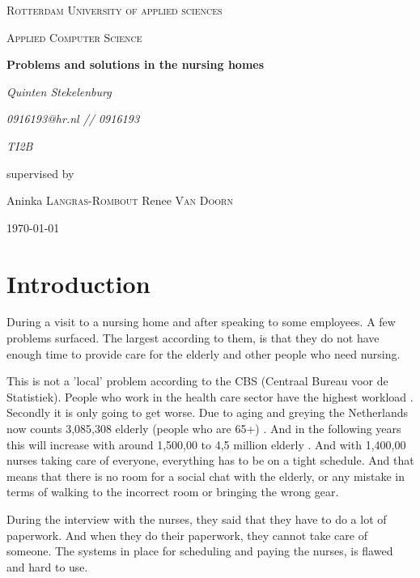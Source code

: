 \documentclass{report}
\begin{document}
\begin{titlepage}
	\centering
	{\scshape\LARGE Rotterdam University of applied sciences \par}
	{\scshape\LARGE Applied Computer Science \par}
	\vspace{1cm}
	{\huge\bfseries Problems and solutions in the nursing homes\par}
	\vspace{2cm}
	{\Large\itshape Quinten Stekelenburg \par}
	{\Large\itshape 0916193@hr.nl // 0916193 \par}
	{\Large\itshape TI2B \par}
	\vfill
	supervised by\par
	Aninka \textsc{Langras-Rombout}
	Renee \textsc{Van Doorn}

	\vfill

	{\large \today\par}
\end{titlepage}
\tableofcontents{}

\chapter{Introduction}
\thispagestyle{fancy}

During a visit to a nursing home and after speaking to some employees. A few problems surfaced. The largest according to them, is
that they do not have enough time to provide care for the elderly and other people who need nursing.

This is not a 'local' problem according to the CBS (Centraal Bureau voor
de Statistiek). People who work in the health care sector have the
highest workload \cite{CBS2016} . Secondly it is only going to get worse. Due to aging and greying
the Netherlands now counts 3,085,308 elderly (people who are 65+) \cite{CBSBevolking}. And
in the following years this will increase with around 1,500,00 to 4,5
million elderly \cite{CBSPrognose2014} . And with 1,400,00 nurses taking care of everyone,
everything has to be on a tight schedule. And that means that there is
no room for a social chat with the elderly, or any mistake in terms of walking to the incorrect room or bringing the wrong gear.

During the interview with the nurses, they said that they have to do a lot of paperwork. And when they do their paperwork, they cannot take care of someone. The systems in place for scheduling and
paying the nurses, is flawed and hard to use.
\end{document}
